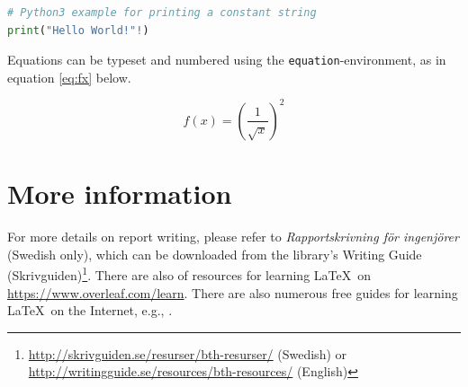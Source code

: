 \documentclass[12pt,a4paper]{article}
\begin{document}
\noindent
\begin{minipage}{\textwidth}
\begin{lstlisting}[frame=single,language=Python,basicstyle=\small,caption={Example of a code-listing.},label={lst:hello}]
# Python3 example for printing a constant string 
print("Hello World!"!)
\end{lstlisting}
\end{minipage}



Equations can be typeset and numbered using the \texttt{equation}-environment, as in equation \ref{eq:fx} below.

\begin{equation}
\label{eq:fx}
    f(x) = (\frac{1}{\sqrt{x}})^2
\end{equation}


\section{More information}
\label{sec:more}
For more details on report writing, please refer to \textit{Rapportskrivning för ingenjörer} \cite{nilsson2018rapport} (Swedish only), which can be downloaded from the library's Writing Guide (Skrivguiden)\footnote{\url{http://skrivguiden.se/resurser/bth-resurser/} (Swedish) or \url{http://writingguide.se/resources/bth-resources/} (English)}.  There are also of resources for learning \LaTeX\ on \url{https://www.overleaf.com/learn}. There are also numerous free guides for learning \LaTeX\ on the Internet, e.g., \cite{oetiker2011not}.

\small


\end{document}
